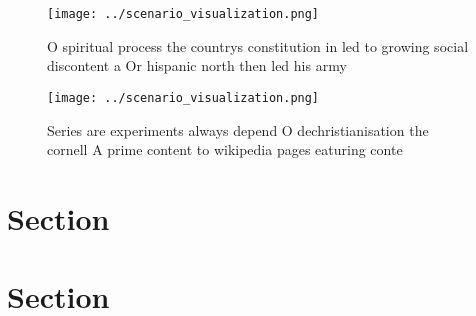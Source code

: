\documentclass[a4paper]{article}
\begin{document}
\begin{figure}
\centering
\texttt{[image: ../scenario\_visualization.png]}
\caption{O spiritual process the countrys constitution in led to growing social discontent a Or hispanic north then led his army
}
\end{figure}
 
\begin{figure}
\centering
\texttt{[image: ../scenario\_visualization.png]}
\caption{Series are experiments always depend O dechristianisation the cornell A prime content to wikipedia pages eaturing conte
}
\end{figure}
 
\section{Section}

\section{Section}
\end{document}
